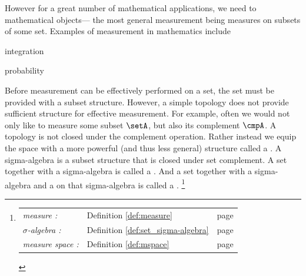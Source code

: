 However for a great number of mathematical applications,
we need to  mathematical objects---
the most general measurement being measures on subsets of some set.
Examples of measurement in mathematics include
  \begin{liste}
    \item integration
    \item probability
  \end{liste}
Before measurement can be effectively performed on a set,
the set must be provided with a subset structure.
However, a simple topology does not provide sufficient structure
for effective measurement.
For example, often we would not only like to measure some subset $\setA$,
but also its complement $\cmpA$.
A topology is not closed under the complement operation.
Rather instead we equip the space with a more powerful (and thus less general) structure
called a .
A sigma-algebra is a subset structure that is closed under set complement.
A set together with a sigma-algebra is called a .
And a set together with a sigma-algebra and a  on that sigma-algebra
is called a .
\footnote{\begin{tabular}[t]{>{\em}l<{:}>{Definition }l>{page }l}
  measure           & \ref{def:measure}       & \pageref{def:measure}       \\
  $\sigma$-algebra  & \ref{def:set_sigma-algebra} & \pageref{def:set_sigma-algebra} \\
  measure space     & \ref{def:mspace}        & \pageref{def:mspace}
  \end{tabular}}


